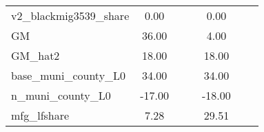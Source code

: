 \begin{table}[htbp]
\begin{tabular}{l*{2}{ccc}}
v2\_blackmig3539\_share&        0.00&            &            &        0.00&            &            \\
GM                  &       36.00&            &            &        4.00&            &            \\
GM\_hat2             &       18.00&            &            &       18.00&            &            \\
base\_muni\_county\_L0 &       34.00&            &            &       34.00&            &            \\
n\_muni\_county\_L0    &      -17.00&            &            &      -18.00&            &            \\
mfg\_lfshare         &        7.28&            &            &       29.51&            &            \\
\bottomrule
\end{tabular}
\end{table}
